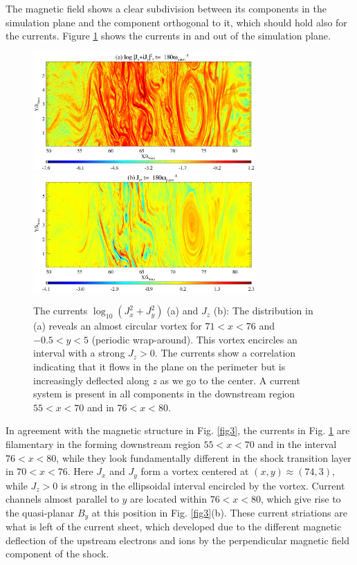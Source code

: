 \documentclass[twocolumn,showpacs,preprintnumbers,amsmath,amssymb]{revtex4}
\begin{document}
The magnetic field shows a clear subdivision between its components in the simulation plane and the 
component orthogonal to it, which should hold also for the currents. Figure \ref{fig4} shows the
currents in and out of the simulation plane.
\begin{figure}
\includegraphics[width=8.5cm]{Fig4a.eps}
\includegraphics[width=8.5cm]{Fig4b.eps}
\caption{The currents $\log_{10} (J_x^2 + J_y^2)$ (a) and $J_z$ (b): The distribution in (a) reveals 
an almost circular vortex for $71<x<76$ and $-0.5 < y < 5$ (periodic wrap-around). This vortex 
encircles an interval with a strong $J_z>0$. The currents show a correlation indicating that it flows 
in the plane on the perimeter but is increasingly deflected along $z$ as we go to the center. A 
current system is present in all components in the downstream region $55<x<70$ and in $76<x<80$.
\label{fig4}}
\end{figure}
In agreement with the magnetic structure in Fig. \ref{fig3}, the currents in Fig. \ref{fig4} are
filamentary in the forming downstream region $55<x<70$ and in the interval $76<x<80$, while they 
look fundamentally different in the shock transition layer in $70<x<76$. Here $J_x$ and $J_y$ form 
a vortex centered at $(x,y) \approx (74,3)$, while $J_z>0$ is strong in the ellipsoidal interval 
encircled by the vortex. Current channels almost parallel to $y$ are located within $76<x<80$, 
which give rise to the quasi-planar $B_y$ at this position in Fig. \ref{fig3}(b). These current
striations are what is left of the current sheet, which developed due to the different magnetic 
deflection of the upstream electrons and ions by the perpendicular magnetic field component of 
the shock.
\end{document}
